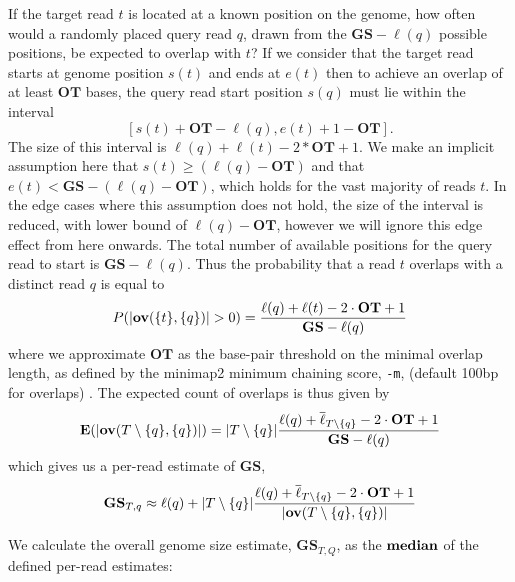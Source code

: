 \documentclass[unnumsec,webpdf,modern,large]{oup-authoring-template}
\theoremstyle{thmstyleone}%
\theoremstyle{thmstyletwo}%
\theoremstyle{thmstylethree}%
\newcommand{\overl}[2]{\mathbf{ov}(#1, #2)}
\DeclarePairedDelimiter\size{\lvert}{\rvert}
\newcommand{\gs}{\textbf{GS}}
\newcommand{\ot}{\textbf{OT}}
\newcommand{\changed}[1]{\textcolor{red}{#1}}
\begin{document}
If the target read $t$ is located at a known position on the genome, how often would a randomly placed query read $q$, drawn from the $\gs - \ell(q)$ possible positions, be expected to overlap with $t$?
If we consider that the target read starts at genome position $s(t)$ and ends at $e(t)$ then to achieve an overlap of at least $\ot$ bases, the query read start position $s(q)$ must lie within the interval $$[s(t) +\ot - \ell(q), e(t) +1 -\ot].$$ The size of this interval is $\ell(q) +\ell(t) -2*\ot +1$.  We make an implicit assumption here that $s(t) \geq ( \ell(q)-\ot)$ and that $e(t) < \gs - (\ell(q)-\ot)$, which holds for the vast majority of reads $t$.  In the edge cases where this assumption does not hold, the size of the interval is reduced, with lower bound of $\ell(q) -\ot$, however we will ignore this edge effect from here onwards. The total number of available positions for the query read to start is $\gs - \ell(q)$. Thus the probability that a read $t$ overlaps with a distinct read $q$ is equal to
\begin{equation}
    P(\size{\overl{\{t\}}{\{q\}}} >0 ) =  \frac{\ell(q) + \ell(t) - 2 \cdot \ot +1 }{\gs-\ell(q)}
\end{equation}
where we approximate $\ot$ as the base-pair threshold on the minimal overlap length, as defined by the minimap2 minimum chaining score, \verb|-m|, (default 100bp for overlaps) \citep{li_minimap2_2018}. The expected count of overlaps is thus given by 
\begin{equation}
 \textbf{E}(\size{\overl{T \setminus \{q\} }{\{q\}}}) = \size{T \setminus \{q\}} \frac{\ell(q) + \overline{\ell}_{T \setminus \{q\}} - 2 \cdot \ot +1 }{\gs-\ell(q)}
\end{equation}
which gives us a per-read estimate of $\gs$, 
\begin{equation}\label{eq:3}
    \gs_{T,q} \approx \ell(q) + \size{T \setminus \{q\}} \frac{\ell(q) + \overline{\ell}_{T \setminus \{q\}} - 2 \cdot \ot +1 }{\size{\overl{T \setminus \{q\}}{\{q\}}}}
\end{equation}


We calculate the overall genome size estimate, $\gs_{T,Q}$, as the $\textbf{\text{median}}$ of the defined per-read estimates:

\end{document}
